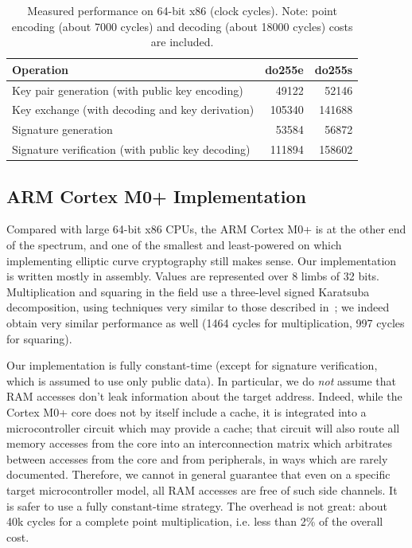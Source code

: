 \documentclass{llncs}
\begin{document}
\begin{table}[H]
    \begin{center}
\begin{tabular}{|l|r|r|}
\hline
\textsf{\textbf{Operation}} &
\textsf{\textbf{do255e}} &
\textsf{\textbf{do255s}} \\
\hline
Key pair generation (with public key encoding)     &   49122 &   52146 \\
Key exchange (with decoding and key derivation)    &  105340 &  141688 \\
Signature generation                               &   53584 &   56872 \\
Signature verification (with public key decoding)  &  111894 &  158602 \\
\hline
\end{tabular}
    \end{center}
    \caption{\label{tab:implementations:perfx86}Measured performance on
    64-bit x86 (clock cycles). Note: point encoding (about 7000 cycles)
    and decoding (about 18000 cycles) costs are included.}
\end{table}

\subsection{ARM Cortex M0+ Implementation}\label{sec:implementations:armv6m}

Compared with large 64-bit x86 CPUs, the ARM Cortex M0+ is at the other
end of the spectrum, and one of the smallest and least-powered on which
implementing elliptic curve cryptography still makes sense. Our
implementation is written mostly in assembly. Values are represented
over 8 limbs of 32 bits. Multiplication and squaring in the field use a
three-level signed Karatsuba decomposition, using techniques very
similar to those described in~\cite{DulHaaHinHutPaaSanSch2015}; we
indeed obtain very similar performance as well (1464 cycles for
multiplication, 997 cycles for squaring).

Our implementation is fully constant-time (except for signature
verification, which is assumed to use only public data). In particular,
we do \emph{not} assume that RAM accesses don't leak information about
the target address. Indeed, while the Cortex M0+ core does not by itself
include a cache, it is integrated into a microcontroller circuit which
may provide a cache; that circuit will also route all memory accesses
from the core into an interconnection matrix which arbitrates between
accesses from the core and from peripherals, in ways which are rarely
documented. Therefore, we cannot in general guarantee that even on a
specific target microcontroller model, all RAM accesses are free of such
side channels. It is safer to use a fully constant-time strategy. The
overhead is not great: about 40k cycles for a complete point
multiplication, i.e. less than 2\% of the overall cost.
\end{document}
